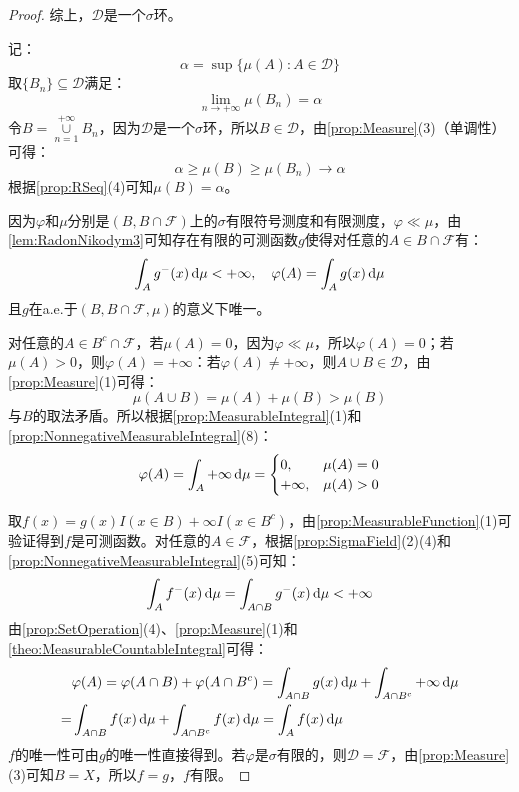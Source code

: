\begin{proof}
	综上，$\mathscr{D}$是一个$\sigma$环。\par
	记：
	\begin{equation*}
		\alpha=\sup\{\mu(A):A\in\mathscr{D}\}
	\end{equation*}
	取$\{B_n\}\subseteq\mathscr{D}$满足：
	\begin{equation*}
		\lim_{n\to+\infty}\mu(B_n)=\alpha
	\end{equation*}
	令$B=\underset{n=1}{\overset{+\infty}{\cup}}B_n$，因为$\mathscr{D}$是一个$\sigma$环，所以$B\in\mathscr{D}$，由\cref{prop:Measure}(3)（单调性）可得：
	\begin{equation*}
		\alpha\geqslant\mu(B)\geqslant\mu(B_n)\to\alpha
	\end{equation*}
	根据\cref{prop:RSeq}(4)可知$\mu(B)=\alpha$。\par
	因为$\varphi$和$\mu$分别是$(B,B\cap\mathscr{F})$上的$\sigma$有限符号测度和有限测度，$\varphi\ll\mu$，由\cref{lem:RadonNikodym3}可知存在有限的可测函数$g$使得对任意的$A\in B\cap\mathscr{F}$有：
	\begin{equation*}
		\int_{A}g^-(x)\mathop{}\!\mathrm{d}\mu<+\infty,\quad\varphi(A)=\int_{A}g(x)\mathop{}\!\mathrm{d}\mu
	\end{equation*}
	且$g$在a.e.于$(B,B\cap\mathscr{F},\mu)$的意义下唯一。\par
	对任意的$A\in B^c\cap\mathscr{F}$，若$\mu(A)=0$，因为$\varphi\ll\mu$，所以$\varphi(A)=0$；若$\mu(A)>0$，则$\varphi(A)=+\infty$：若$\varphi(A)\ne+\infty$，则$A\cup B\in\mathscr{D}$，由\cref{prop:Measure}(1)可得：
	\begin{equation*}
		\mu(A\cup B)=\mu(A)+\mu(B)>\mu(B)
	\end{equation*}
	与$B$的取法矛盾。所以根据\cref{prop:MeasurableIntegral}(1)和\cref{prop:NonnegativeMeasurableIntegral}(8)：
	\begin{equation*}
		\varphi(A)=\int_{A}+\infty\mathop{}\!\mathrm{d}\mu=
		\begin{cases}
			0,&\mu(A)=0 \\
			+\infty,&\mu(A)>0
		\end{cases}
	\end{equation*}\par
	取$f(x)=g(x)I(x\in B)+\infty I(x\in B^c)$，由\cref{prop:MeasurableFunction}(1)可验证得到$f$是可测函数。对任意的$A\in\mathscr{F}$，根据\cref{prop:SigmaField}(2)(4)和\cref{prop:NonnegativeMeasurableIntegral}(5)可知：
	\begin{equation*}
		\int_{A}f^-(x)\mathop{}\!\mathrm{d}\mu=\int_{A\cap B}g^-(x)\mathop{}\!\mathrm{d}\mu<+\infty
	\end{equation*}
	由\cref{prop:SetOperation}(4)、\cref{prop:Measure}(1)和\cref{theo:MeasurableCountableIntegral}可得：
	\begin{align*}
		&\varphi(A)=\varphi(A\cap B)+\varphi(A\cap B^c)=\int_{A\cap B}g(x)\mathop{}\!\mathrm{d}\mu+\int_{A\cap B^c}+\infty\mathop{}\!\mathrm{d}\mu \\
		=&\int_{A\cap B}f(x)\mathop{}\!\mathrm{d}\mu+\int_{A\cap B^c}f(x)\mathop{}\!\mathrm{d}\mu=\int_{A}f(x)\mathop{}\!\mathrm{d}\mu
	\end{align*}
	$f$的唯一性可由$g$的唯一性直接得到。若$\varphi$是$\sigma$有限的，则$\mathscr{D}=\mathscr{F}$，由\cref{prop:Measure}(3)可知$B=X$，所以$f=g$，$f$有限。
\end{proof}

